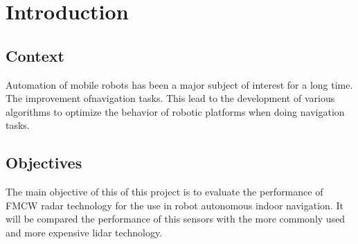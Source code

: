 \chapter{Introduction} \label{ch:introduction}









\section{Context}
Automation of mobile robots has been a major subject of interest for a long time. The improvement ofnavigation tasks. This lead to the development of various algorithms to optimize the behavior of robotic platforms when doing navigation tasks. 

\section{Objectives}
The main objective of this of this project is to evaluate the performance of FMCW radar technology for the use in robot autonomous indoor navigation. It will be compared the performance of this sensors with the more commonly used and more expensive lidar technology.


